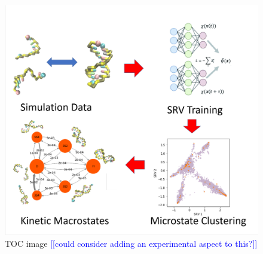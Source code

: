 \documentclass[journal=jpcbfk,manuscript=article]{achemso}
\newcommand*{\noteb}[1]{\textcolor{blue}{[[#1]]}}		%
\begin{document}
\clearpage
\newpage

\begin{figure}[ht!]
	\begin{center} 
        \includegraphics[width=150mm, scale=1]{TOC.pdf}
        \caption*{TOC image \noteb{could consider adding an experimental aspect to this?}}
        \label{fig:TOC}
	\end{center}
\end{figure}
\end{document}
